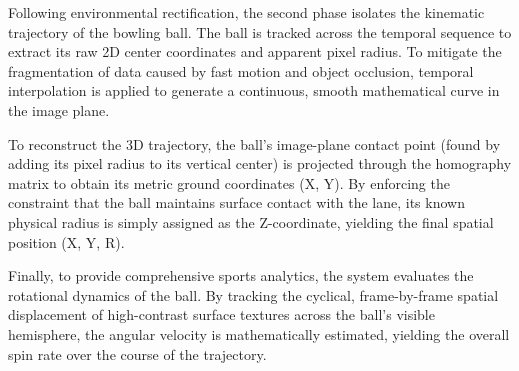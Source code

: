 Following environmental rectification, the second phase isolates the kinematic trajectory of the bowling ball. The ball is tracked across the temporal sequence to extract its raw 2D center coordinates and apparent pixel radius. To mitigate the fragmentation of data caused by fast motion and object occlusion, temporal interpolation is applied to generate a continuous, smooth mathematical curve in the image plane.

To reconstruct the 3D trajectory, the ball's image-plane contact point (found by adding its pixel radius to its vertical center) is projected through the homography matrix to obtain its metric ground coordinates (X, Y). By enforcing the constraint that the ball maintains surface contact with the lane, its known physical radius is simply assigned as the Z-coordinate, yielding the final spatial position (X, Y, R). 

Finally, to provide comprehensive sports analytics, the system evaluates the rotational dynamics of the ball. By tracking the cyclical, frame-by-frame spatial displacement of high-contrast surface textures across the ball's visible hemisphere, the angular velocity is mathematically estimated, yielding the overall spin rate over the course of the trajectory.
